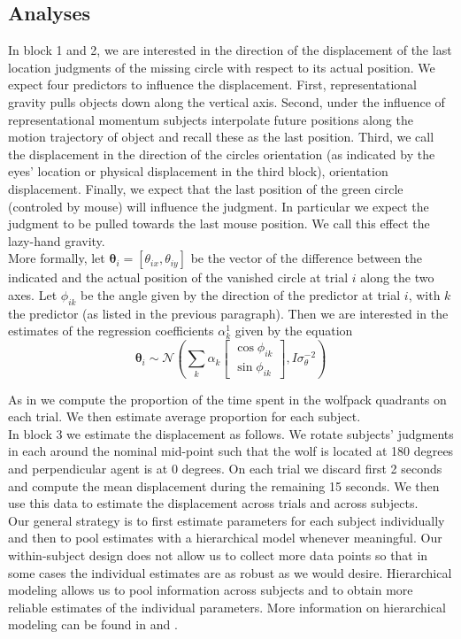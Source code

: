 \documentclass{article}
\begin{document}
\subsection{Analyses}
In block 1 and 2, we are interested in the direction of the displacement of the last location judgments of the missing circle with respect to its actual position. We expect four predictors to influence the displacement. First, representational gravity pulls objects down along the vertical axis. Second, under the influence of representational momentum subjects interpolate future positions along the motion trajectory of object and recall these as the last position. Third, we call the displacement in the direction of the circles orientation (as indicated by the eyes' location or physical displacement in the third block), orientation displacement. Finally, we expect that the last position of the green circle (controled by mouse) will influence the judgment. In particular we expect the judgment to be pulled towards the last mouse position. We call this effect the lazy-hand gravity.\\
More formally, let $\mathbf \theta_i =[\theta_{ix}, \theta_{iy}]$ be the vector of the difference between the indicated and the actual position of the vanished circle at trial $i$ along the two axes. Let $\phi_{ik}$ be the angle given by the direction of the predictor at trial $i$, with $k$ the predictor (as listed in the previous paragraph). Then we are interested in the estimates of the regression coefficients $\alpha^1_k$ given by the equation\\

\begin{equation}
\mathbf \theta_i \sim  \mathcal{N}\left(\sum_k \alpha_k \begin{bmatrix} \cos \phi_{ik} \\ \sin \phi_{ik} \end{bmatrix}, I\sigma_\theta^{-2} \right)
\end{equation} 

As in \citet{gao10} we compute the proportion of the time spent in the wolfpack quadrants on each trial. We then estimate average proportion for each subject. \\
In block 3 we estimate the displacement as follows. We rotate subjects' judgments in each around the nominal mid-point such that the wolf is located at 180 degrees and perpendicular agent is at 0 degrees. On each trial we discard first 2 seconds and compute the mean displacement during the remaining 15 seconds. We then use this data to estimate the displacement across trials and across subjects.\\
Our general strategy is to first estimate parameters for each subject individually and then to pool estimates with a hierarchical model whenever meaningful. Our within-subject design does not allow us to collect more data points so that in some cases the individual estimates are as robust as we would desire. Hierarchical modeling allows us to pool information across subjects and to obtain more reliable estimates of the individual parameters. More information on hierarchical modeling can be found in \citet{gelman07} and \citet{lee11}.\\
\end{document}
